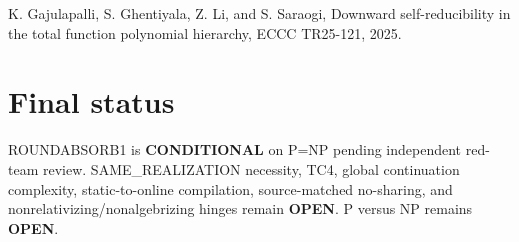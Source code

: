 \documentclass[11pt]{article}
\begin{document}
K. Gajulapalli, S. Ghentiyala, Z. Li, and S. Saraogi, Downward self-reducibility in the total function polynomial hierarchy, ECCC TR25-121, 2025.

\section*{Final status}
ROUNDABSORB1 is \textbf{CONDITIONAL} on P=NP pending independent red-team review. SAME\_REALIZATION necessity, TC4, global continuation complexity, static-to-online compilation, source-matched no-sharing, and nonrelativizing/nonalgebrizing hinges remain \textbf{OPEN}. P versus NP remains \textbf{OPEN}.

\end{document}
